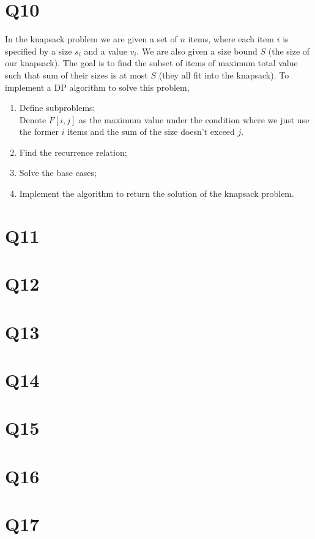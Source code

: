 \documentclass[a4paper,11pt]{article}
\newenvironment{qparts}{\begin{enumerate}[{(}a{)}]}{\end{enumerate}}
\begin{document}
\section*{Q10}
In the knapsack problem we are given a set of $n$ items, where
each item $i$ is speciﬁed by a size $s_i$ and a value $v_i$. We are also
given a size bound $S$ (the size of our knapsack). The goal is to
ﬁnd the subset of items of maximum total value such that sum
of their sizes is at most $S$ (they all ﬁt into the knapsack).
To implement a DP algorithm to solve this problem,
\begin{qparts}
    
    \item Deﬁne subproblems;\\
    Denote $F[i,j]$ as the maximum value under the condition where we just use the former $i$ items and the sum of the size doesn't exceed $j$.
    \item Find the recurrence relation;
    \item Solve the base cases;
    \item Implement the algorithm to return the solution of the
    knapsack problem.
\end{qparts}
\section*{Q11}
\section*{Q12}
\section*{Q13}
\section*{Q14}
\section*{Q15}
\section*{Q16}
\section*{Q17}
\end{document}
